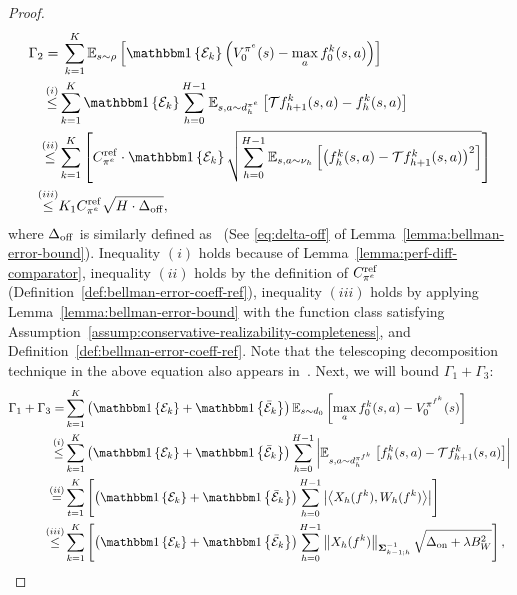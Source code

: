 \begin{proof}
\begin{equation}
    \label{eq:derivation_gamma2}
    \begin{split}
        \Gamma_2 = &\;\sum_{k=1}^K\bb E_{s\sim\rho}\brac{\indicator{{\mc E}_k}\paren{V_0^{\pi^e}(s)-\max_a f_0^k(s,a)}}\\
        \overset{(i)}{\leq} & \sum_{k=1}^K\indicator{\mc E_k}\sum_{h=0}^{H-1}\bb E_{s,a\sim d_h^{\pi^e}}\brac{\mc T f_{h+1}^k(s,a)-f_h^k(s,a)}\\
        \overset{(ii)}{\leq} & \sum_{k=1}^K \brac{C_{\pi^e}^\mr{ref}\cdot\indicator{\mc E_k}\sqrt{\sum_{h=0}^{H-1}\bb E_{s,a\sim\nu_h}\brac{\paren{f_h^k(s,a)-\mc T f_{h+1}^k(s,a)}^2}}} \\
        \overset{(iii)}{\leq} & K_1C_{\pi^e}^\mr{ref}\sqrt{H\cdot \Deltaoff},
    \end{split}
\end{equation}
where $\Delta_\mathrm{off}$ is similarly defined as~\citet{song2023hybrid} (See \eqref{eq:delta-off} of Lemma~\ref{lemma:bellman-error-bound}). Inequality $(i)$ holds because of Lemma~\ref{lemma:perf-diff-comparator}, inequality $(ii)$ holds by the definition of $C_{\pi^e}^\mathrm{ref}$ (Definition~\ref{def:bellman-error-coeff-ref}), inequality $(iii)$ holds by applying Lemma~\ref{lemma:bellman-error-bound} with the function class satisfying Assumption~\ref{assump:conservative-realizability-completeness}, and Definition~\ref{def:bellman-error-coeff-ref}. Note that the telescoping decomposition technique in the above equation also appears in~\citep{xie2020q,jin2021bellman,du2021bilinear}. Next, we will bound $\Gamma_1+\Gamma_3$:
\begin{equation}
    \begin{split}
        \Gamma_1+\Gamma_3  =& \sum_{k=1}^K\paren{\indicator{\mc E_k}+\indicator{\bar{\mc E}_k}}\bb E_{s\sim d_0}\brac{\max_a f_0^k(s,a)-V_0^{\pi^{f^k}}(s)}\\
        \overset{(i)}{\leq}& \sum_{k=1}^K\paren{\indicator{\mc E_k}+\indicator{\bar{\mc E}_k}}\sum_{h=0}^{H-1}\abs{\bb E_{s,a\sim d_h^{\pi^{f^k}}}\brac{f_h^k(s,a)-\mc T f_{h+1}^k(s,a)}}\\
        \overset{(ii)}{=}&\sum_{t=1}^K\brac{\paren{\indicator{\mc E_k}+\indicator{\bar{\mc E}_k}}\sum_{h=0}^{H-1}\abs{\innerprod{X_h(f^k)}{W_h(f^k)}}}\\
        \overset{(iii)}{\leq}&\sum_{k=1}^K\brac{\paren{\indicator{\mc E_k}+\indicator{\bar{\mc E}_k}}\sum_{h=0}^{H-1}\norm{X_h(f^k)}{\mb \Sigma^{-1}_{k-1;h}}\sqrt{\Deltaon+\lambda B_W^2}},
    \end{split}

\end{equation}
\end{proof}

